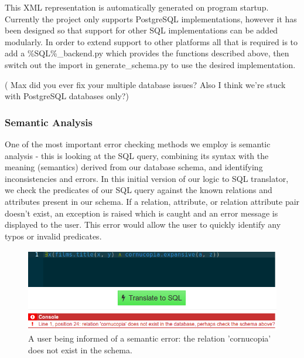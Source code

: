 \documentclass[a4paper, 11pt]{article}
\begin{document}
      This XML representation is automatically generated on program startup.
      Currently the project only supports PostgreSQL implementations, however it
      has been designed so that support for other SQL implementations can be
      added modularly. In order to extend support to other platforms all that is
      required is to add a \%SQL\%\_backend.py which provides the functions
      described above, then switch out the import in generate\_schema.py to use
      the desired implementation.


      ( Max did you ever fix your multiple database issues? Also I
      think we're stuck with PostgreSQL databases only?)

    \subsubsection{Semantic Analysis}
      One of the most important error checking methods we employ is semantic
      analysis - this is looking at the SQL query, combining its syntax with the
      meaning (semantics) derived from our database schema, and identifying
      inconsistencies and errors. In this initial version of our logic to SQL
      translator, we check the predicates of our SQL query against the known
      relations and attributes present in our schema. If a relation, attribute,
      or relation attribute pair doesn't exist, an exception is raised which is
      caught and an error message is displayed to the user. This error would
      allow the user to quickly identify any typos or invalid predicates.

      \begin{figure}[h!]
        \centering
        \includegraphics[width=1.0\textwidth]{images/error.png}
        \caption{A user being informed of a semantic error: the relation
          'cornucopia' does not exist in the schema.}
      \end{figure}
\end{document}
